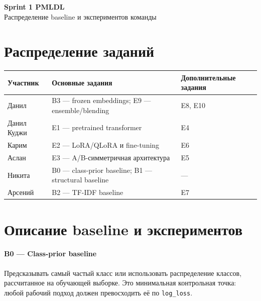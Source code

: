 \documentclass[a4paper,11pt]{article}
\newcommand{\code}[1]{\texttt{#1}}
\newcommand{\experiment}[2]{\paragraph{\textcolor{accent}{#1 --- #2}}}
\begin{document}
\begin{center}
  {\Huge\bfseries\color{accent} Sprint 1 PMLDL}\\[0.4em]
  {\large Распределение baseline и экспериментов команды}
\end{center}

\section*{Распределение заданий}

\renewcommand{\arraystretch}{1.35}
\begin{center}
\begin{tabular}{|>{\raggedright\arraybackslash}p{}|
                >{\raggedright\arraybackslash}p{}|
                >{\raggedright\arraybackslash}p{}|}
\hline
\textbf{Участник} & \textbf{Основные задания} & \textbf{Дополнительные задания} \\
\hline
Данил & B3 --- frozen embeddings; E9 --- ensemble/blending & E8, E10 \\
\hline
Данил Куджи & E1 --- pretrained transformer & E4 \\
\hline
Карим & E2 --- LoRA/QLoRA и fine-tuning & E6 \\
\hline
Аслан & E3 --- A/B-симметричная архитектура & E5 \\
\hline
Никита & B0 --- class-prior baseline; B1 --- structural baseline & --- \\
\hline
Арсений & B2 --- TF-IDF baseline & E7 \\
\hline
\end{tabular}
\end{center}

\vspace{0.5em}
\noindent{}

\section*{Описание baseline и экспериментов}

\experiment{B0}{Class-prior baseline}
Предсказывать самый частый класс или использовать распределение классов,
рассчитанное на обучающей выборке. Это минимальная контрольная точка: любой
рабочий подход должен превосходить её по \code{log\_loss}.
\end{document}
